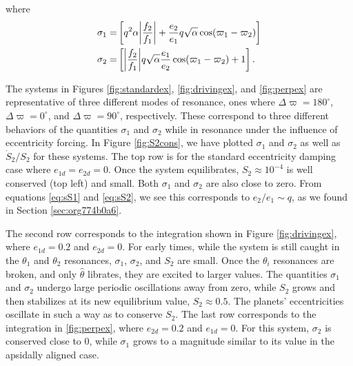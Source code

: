 \documentclass[usenatbib,twocolumn]{mnras}
\DeclarePairedDelimiter{\abs}{|}{|}
\begin{document}
\noindent
where
\begin{align}
  \label{eq:sS1}
  \sigma_1=&\left[
                  q^2\alpha\abs*{\frac{f_2}{f_1}}
                  + \frac{e_2}{e_1}q\sqrt{\alpha}\cos(\varpi_1-\varpi_2)
                  \right]\\
  \label{eq:sS2}
  \sigma_2=&\left[
                  \abs*{\frac{f_2}{f_1}} q\sqrt{\alpha}
                  \frac{e_1}{e_2}\cos(\varpi_1-\varpi_2) + 1
                  \right].
\end{align}

The systems in Figures \ref{fig:standardex}, \ref{fig:drivingex}, and
\ref{fig:perpex} are representative of three different modes of
resonance, ones where \(\Delta\varpi=180^\circ\),
\(\Delta\varpi=0^\circ\), and \(\Delta\varpi=90^\circ\),
respectively. These correspond to three different behaviors of the
quantities \(\sigma_1\) and \(\sigma_2\) while in resonance
under the influence of eccentricity forcing.
In Figure \ref{fig:S2cons}, we have plotted \(\sigma_1\) and
\(\sigma_2\) as well as \(\dot S_2/S_2\) for these systems.  The top
row is for the standard eccentricity damping case where
\(e_{1d}=e_{2d}=0\).  Once the system equilibrates, \(S_2\approx 10^{-4}\)
is well conserved (top left) and small. Both \(\sigma_1\) and
\(\sigma_2\) are also close to zero. From equations \eqref{eq:sS1}
and \eqref{eq:sS2}, we see this corresponds to \(e_2/e_1 \sim q\), as we
found in Section \ref{sec:org774b0a6}.

The second row corresponds to the integration shown in Figure
\ref{fig:drivingex}, where \(e_{1d}=0.2\) and \(e_{2d}=0\).  For early
times, while the system is still caught in the \(\theta_1\) and
\(\theta_2\) resonances, \(\sigma_1\), \(\sigma_2\), and \(S_2\) are
small.  Once the \(\theta_i\) resonances are broken, and only
\(\hat\theta\) librates, they are excited to larger values.  The
quantities \(\sigma_1\) and \(\sigma_2\) undergo large periodic
oscillations away from zero, while \(S_2\) grows and then stabilizes at
its new equilibrium value, \(S_2\approx 0.5\). The planets'
eccentricities oscillate in such a way as to conserve \(S_2\).  The last
row corresponds to the integration in \ref{fig:perpex}, where
\(e_{2d}=0.2\) and \(e_{1d}=0\).  For this system, \(\sigma_2\) is
conserved close to 0, while \(\sigma_1\) grows to a magnitude
similar to its value in the apsidally aligned case.
\end{document}
